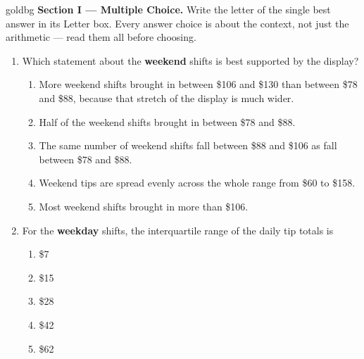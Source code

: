 \documentclass[12pt]{article}
\begin{document}
\vspace{0.14in}

\boxguard[16]
\begin{headlinebox}{goldbg}
\small
\textbf{Section I --- Multiple Choice.} Write the letter of the single best answer in its Letter box. Every answer choice is
about the context, not just the arithmetic --- read them all before choosing.
\end{headlinebox}

\vspace{0.10in}

\begin{enumerate}[leftmargin=1.9em, itemsep=0.13in]

  \item Which statement about the \textbf{weekend} shifts is best supported by the display?
        \begin{enumerate}[label=\textbf{(\Alph*)}, leftmargin=2.2em, itemsep=2pt]
          \item More weekend shifts brought in between \$106 and \$130 than between \$78 and
                \$88, because that stretch of the display is much wider.
          \item Half of the weekend shifts brought in between \$78 and \$88.
          \item The same number of weekend shifts fall between \$88 and \$106 as fall between
                \$78 and \$88.
          \item Weekend tips are spread evenly across the whole range from \$60 to \$158.
          \item Most weekend shifts brought in more than \$106.
                \hfill{}
        \end{enumerate}

  \boxguard[9]
  \item For the \textbf{weekday} shifts, the interquartile range of the daily tip totals is
        \begin{enumerate}[label=\textbf{(\Alph*)}, leftmargin=2.2em, itemsep=2pt]
          \item \$7
          \item \$15
          \item \$28
          \item \$42
          \item \$62
                \hfill{}
        \end{enumerate}


\end{enumerate}
\end{document}
